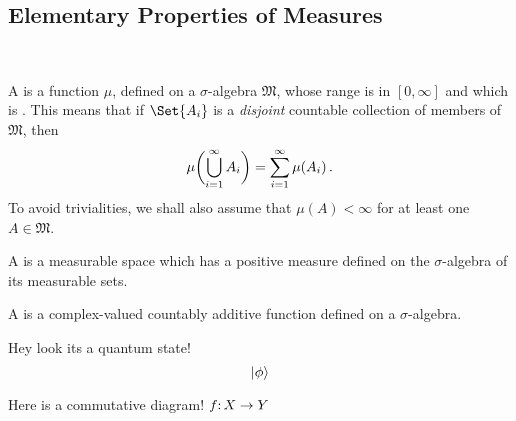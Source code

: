 \documentclass[12pt]{CrispyNotes}
\begin{document}
\subsection{Elementary Properties of Measures}
\begin{definition}~
    \begin{thmitems}
        \item
            A  is a function $\mu$, defined on a $\sigma$-algebra $\mathfrak{M}$, whose range is in $[0, \infty]$ and which is . This means that if $\Set{A_i}$ is a \emph{disjoint} countable collection of members of $\mathfrak{M}$, then
                \begin{equation}\label{d4}
                    \mu\biggl(\bigcup_{i=1}^\infty A_i\biggr) = \sum_{i=1}^\infty \mu(A_i)\mathclose{\,\text{.}}
                \end{equation}
            To avoid trivialities, we shall also assume that $\mu(A)<\infty$ for at least one $A\in\mathfrak{M}$.

        \item
            A  is a measurable space which has a positive measure defined on the $\sigma$-algebra of its measurable sets.

        \item
            A  is a complex-valued countably additive function defined on a $\sigma$-algebra.
  \end{thmitems}
\end{definition}

Hey look its a quantum state! 
    \begin{equation*}
      \lvert\phi\rangle
    \end{equation*}

Here is a commutative diagram! \(f\mathpunct{:} X \to Y\)


\printbibliography
\end{document}
